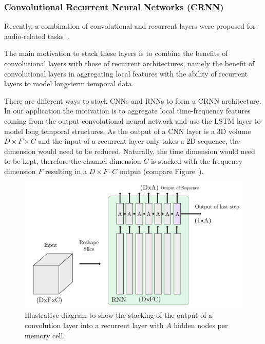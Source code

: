 \subsubsection{Convolutional Recurrent Neural Networks (CRNN)}%
Recently, a combination of convolutional and recurrent layers were proposed for audio-related tasks~\cite{sainath15, amodei16, Choi17, cakir17}.

The main motivation to stack these layers is to combine the benefits of convolutional layers with those of recurrent architectures, namely the benefit of convolutional layers in aggregating local features with the ability of recurrent layers to model long-term temporal data.

There are different ways to stack CNNs and RNNs to form a CRNN architecture.
In our application the motivation is to aggregate local time-frequency features coming from the output convolutional neural network and use the LSTM layer to model long temporal structures.
As the output of a CNN layer is a 3D volume \(D \times F \times C\) and the input of a recurrent layer only takes a 2D sequence, the dimension would need to be reduced. Naturally, the time dimension would need to be kept, therefore the channel dimension \(C\) is stacked with the frequency dimension \(F\) resulting in a \(D \times F \cdot C\) output (compare Figure~\cite{fig:crnn}).

\begin{figure}[t]
\centering
\includegraphics[width=\columnwidth]{Chapters/08_Analysis_CountNet/figures/crnn.pdf}
\caption{Illustrative diagram to show the stacking of the output of a convolution layer into a recurrent layer with \(A\) hidden nodes per memory cell.}%
\label{fig:crnn}
\end{figure}

